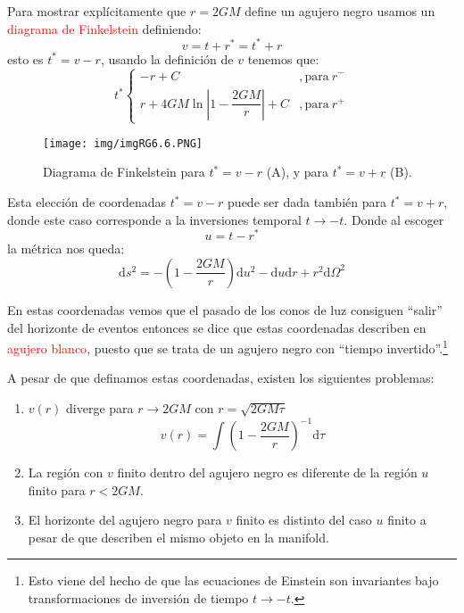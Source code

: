 \documentclass[../main]{subfiles}
\begin{document}
\begin{adjustwidth}{0pt}{-100pt}
Para mostrar explícitamente que $r=2GM$ define un agujero negro usamos un \textcolor{red}{diagrama de Finkelstein} definiendo:
\begin{equation}
    v=t+r^*=t^*+r
\end{equation}
esto es $t^*=v-r$, usando la definición de $v$ tenemos que:
\begin{equation}
    t^*\left\{
    \begin{array}{cc}
        -r+C &, \text{para} \ r^-\\
        r+4GM\ln\left|1-\dfrac{2GM}{r}\right|+C &, \text{para} \ r^+
    \end{array}
    \right.
\end{equation}
\begin{figure}[H]
    \begin{adjustwidth}{0pt}{-100pt}
    \begin{center}
        \texttt{[image: img/imgRG6.6.PNG]}
    \end{center}
    \caption{Diagrama de Finkelstein para $t^*=v-r$ (A), y para $t^*=v+r$ (B).}
    \end{adjustwidth}
\end{figure}
Esta elección de coordenadas $t^*=v-r$ puede ser dada también para $t^*=v+r$, donde este caso corresponde a la inversiones temporal $t\rightarrow -t$. Donde al escoger
\begin{equation}
    u=t-r^*
\end{equation}
la métrica nos queda:
\begin{equation}
    \mathrm{d}s^2=-\left(1-\dfrac{2GM}{r}\right)\mathrm{d}u^2-\mathrm{d}u\mathrm{d}r+r^2\mathrm{d}\Omega^2
\end{equation}

En estas coordenadas vemos que el pasado de los conos de luz consiguen ``salir'' del horizonte de eventos entonces se dice que estas coordenadas describen en \textcolor{red}{agujero blanco}, puesto que se trata de un agujero negro con ``tiempo invertido''.\footnote{Esto viene del hecho de que las ecuaciones de Einstein son invariantes bajo transformaciones de inversión de tiempo $t\rightarrow -t$.}

A pesar de que definamos estas coordenadas, existen los siguientes problemas:
\begin{enumerate}
    \item $v(r)$ diverge para $r\rightarrow 2GM$ con $r=\sqrt{2GM\tau}$
    \begin{equation}
        v(r)=\int \left(1-\dfrac{2GM}{r}\right)^{-1}\mathrm{d}\tau
    \end{equation}
    \item La región con $v$ finito dentro del agujero negro es diferente de la región $u$ finito para $r<2GM$.
    \item El horizonte del agujero negro para $v$ finito es distinto del caso $u$ finito a pesar de que describen el mismo objeto en la manifold.
\end{enumerate}


\end{adjustwidth}
\end{document}
